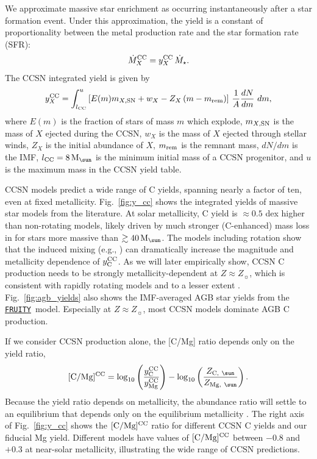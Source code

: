 \documentclass[fleqn,
usenatbib]{mnras}
\makeatletter
\newcommand{\fruity}{\texttt{\hyperlink{fruity}{FRUITY}}}
\newcommand{\Ycc}{{y_{\rm C}^{\rm CC}}}
\newcommand{\Ymg}{{y_{\rm Mg}^{\rm CC}}}
\newcommand{\Mo}{ {\rm M}_{\sun}}
\newcommand{\Zo}{ Z_{\sun}}
\DeclareRobustCommand\citepos
  {\begingroup
   \let\NAT@nmfmt\NAT@posfmt%
   \NAT@swafalse\let\NAT@ctype\z@\NAT@partrue
   \@ifstar{\NAT@fulltrue\NAT@citetp}{\NAT@fullfalse\NAT@citetp}}
\let\NAT@orig@nmfmt\NAT@nmfmt
\def\NAT@posfmt#1{\NAT@orig@nmfmt{#1's}}
\makeatother
\begin{document}
We approximate massive star enrichment as occurring instantaneously after a star formation event. Under this approximation, the yield is a constant  of proportionality between the metal production rate and the star formation rate (SFR):
\begin{equation}
    \dot{M}_X^{\rm CC} = y_{X}^{\rm CC}\, \dot{M}_\star.
\end{equation}
The CCSN integrated yield is given by
\begin{equation}
y_{X}^{\rm CC} = \int_{l_{\rm CC}}^{u} \left[E(m) m_{X\rm, SN} + w_X - Z_X\,(m-m_{\rm rem})\right]\,\frac{1}{A} \frac{dN}{dm}\ dm,
\end{equation}
where $E(m)$ is the fraction of stars of mass $m$ which explode, $m_{X,\rm SN}$ is the mass of $X$ ejected during the CCSN, $w_X$ is the mass of $X$ ejected through stellar winds, $Z_X$ is the initial abundance of $X$, $m_{\rm rem}$ is the remnant mass, $dN/dm$ is the IMF, $l_{\rm CC}=8\,\Mo$ is the minimum initial mass of a CCSN progenitor, and $u$ is the maximum mass in the CCSN yield table. 

CCSN models predict a wide range of C yields, spanning nearly a factor of ten, even at fixed metallicity.
Fig.~\ref{fig:y_cc} shows the integrated yields of massive star models from the literature. At solar metallicity, \citepos{sukhbold+16} C yield is $\approx0.5$ dex higher than \citepos{LC18} non-rotating models, likely driven by much stronger (C-enhanced) mass loss in \citet{sukhbold+16} for stars more massive than $\gtrsim40\,\Mo$.
 The \cite{LC18} models including rotation show that the induced mixing (e.g., \citealt{frischknecht+16}) can dramatically increase the magnitude and metallicity dependence of $\Ycc$. As we will later empirically show, CCSN C production needs to be strongly metallicity-dependent at $Z \approx \Zo$, which is consistent with \citepos{LC18} rapidly rotating models and to a lesser extent \citet{NKT13}.
Fig.~\ref{fig:agb_yields} also shows the IMF-averaged AGB star yields from the \fruity\ model. Especially at $Z\approx \Zo$, most CCSN models dominate AGB C production. 


If we consider CCSN production alone, the [C/Mg] ratio depends only on the yield ratio,
\begin{equation}\label{eq:c_mg_cc}
    {\rm [C/Mg]^{CC}} = \log_{10}\left( \frac{\Ycc}{\Ymg}\right) - \log_{10} \left( \frac{Z_{{\rm C},\ \sun }}{Z_{{\rm Mg},\ \sun }} \right).
\end{equation}
Because the yield ratio depends on metallicity, the abundance ratio will settle to an equilibrium that depends only on the equilibrium metallicity \citep{WAF17, james+23}. The right axis of Fig.~\ref{fig:y_cc} shows the  ${\rm [C/Mg]^{CC}}$ ratio for different CCSN C yields and our fiducial Mg yield. Different models have values of ${\rm [C/Mg]^{CC}}$ between $ -0.8$ and $+0.3$ at near-solar metallicity, illustrating the wide range of CCSN predictions. 
\end{document}
